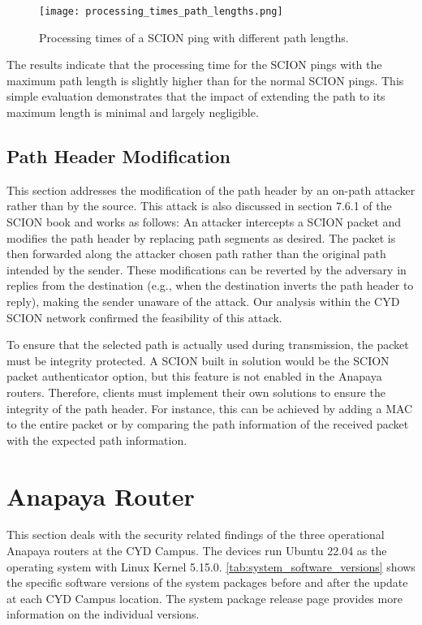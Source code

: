 \begin{figure}[h]
    \centering
    \texttt{[image: processing\_times\_path\_lengths.png]}
    \caption{Processing times of a SCION ping with different path lengths.}
    \label{fig:path_extension}
\end{figure}

The results indicate that the processing time for the SCION pings with the maximum path length is slightly higher than for the normal SCION pings.
This simple evaluation demonstrates that the impact of extending the path to its maximum length is minimal and largely negligible.


\subsection{Path Header Modification}
\label{sec:path-header-modification}
This section addresses the modification of the path header by an on-path attacker rather than by the source.
This attack is also discussed in section 7.6.1 of the SCION book \cite{Perrig2022} and works as follows:
An attacker intercepts a SCION packet and modifies the path header by replacing path segments as desired.
The packet is then forwarded along the attacker chosen path rather than the original path intended by the sender.
These modifications can be reverted by the adversary in replies from the destination (e.g., when the destination inverts the path header to reply), making the sender unaware of the attack.
Our analysis within the CYD SCION network confirmed the feasibility of this attack.

To ensure that the selected path is actually used during transmission, the packet must be integrity protected.
A SCION built in solution would be the SCION packet authenticator option, but this feature is not enabled in the Anapaya routers.
Therefore, clients must implement their own solutions to ensure the integrity of the path header.
For instance, this can be achieved by adding a MAC to the entire packet or by comparing the path information of the received packet with the expected path information.






\section{Anapaya Router}
\label{sec:findings:anapaya-router}
This section deals with the security related findings of the three operational Anapaya routers at the CYD Campus.
The devices run Ubuntu 22.04 as the operating system with Linux Kernel 5.15.0.
\cref{tab:system_software_versions} shows the specific software versions of the system packages before and after the update at each CYD Campus location.
The system package release page \cite{anapayaSystemPackage} provides more information on the individual versions.

